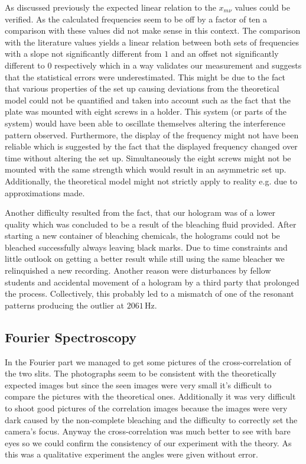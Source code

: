 As discussed previously the expected linear relation to the $x_{m\nu}$ values could be verified. As the calculated frequencies seem to be off by a factor of ten a comparison with these values did not make sense in this context. The comparison with the literature values yields a linear relation between both sets of frequencies with a slope not significantly different from $1$ and an offset not significantly different to $0$ respectively which in a way validates our measurement and suggests that the statistical errors were underestimated. This might be due to the fact that various properties of the set up causing deviations from the theoretical model could not be quantified and taken into account such as the fact that the plate was mounted with eight screws in a holder. This system (or parts of the system) would have been able to oscillate themselves altering the interference pattern observed. Furthermore, the display of the frequency might not have been reliable which is suggested by the fact that the displayed frequency changed over time without altering the set up. Simultaneously the eight screws might not be mounted with the same strength which would result in an asymmetric set up. Additionally, the theoretical model might not strictly apply to reality e.g. due to approximations made.

Another difficulty resulted from the fact, that our hologram was of a lower quality which was concluded to be a result of the bleaching fluid provided. After starting a new container of bleaching chemicals, the holograms could not be bleached successfully always leaving black marks. Due to time constraints and little outlook on getting a better result while still using the same bleacher we relinquished a new recording. Another reason were disturbances by fellow students and accidental movement of a hologram by a third party that prolonged the process. Collectively, this probably led to a mismatch of one of the resonant patterns producing the outlier at $2061\,\mathrm{Hz}$.


\subsection{Fourier Spectroscopy}
In the Fourier part we managed to get some pictures of the cross-correlation of the two slits. The photographs seem to be consistent with the theoretically expected images but since the seen images were very small it's difficult to compare the pictures with the theoretical ones. Additionally it was very difficult to shoot good pictures of the correlation images because the images were very dark caused by the non-complete bleaching and the difficulty to correctly set the camera's focus. Anyway the cross-correlation was much better to see with bare eyes so we could confirm the consistency of our experiment with the theory. As this was a qualitative experiment the angles were given without error.
